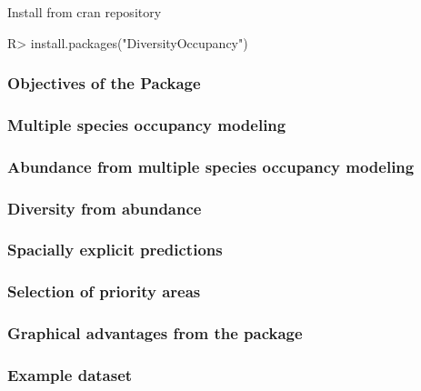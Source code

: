 \documentclass[article]{jss}
\begin{document}
Install from cran repository

\begin{CodeChunk}

\begin{CodeInput}
R> install.packages("DiversityOccupancy")
\end{CodeInput}
\end{CodeChunk}

\subsubsection{Objectives of the
Package}\label{objectives-of-the-package}

\subsubsection{Multiple species occupancy
modeling}\label{multiple-species-occupancy-modeling}

\subsubsection{Abundance from multiple species occupancy
modeling}\label{abundance-from-multiple-species-occupancy-modeling}

\subsubsection{Diversity from abundance}\label{diversity-from-abundance}

\subsubsection{Spacially explicit
predictions}\label{spacially-explicit-predictions}

\subsubsection{Selection of priority
areas}\label{selection-of-priority-areas}

\subsubsection{Graphical advantages from the
package}\label{graphical-advantages-from-the-package}

\subsubsection{Example dataset}\label{example-dataset}
\end{document}
